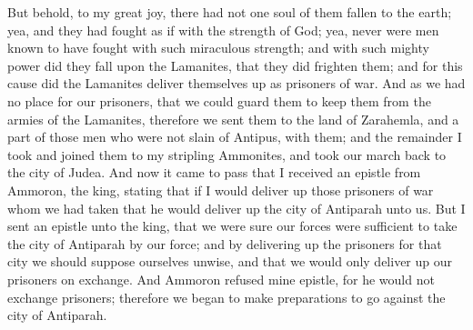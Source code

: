 But behold, to my great joy, there had not one soul of them fallen to the earth; yea, and they had fought as if with the strength of God; yea, never were men known to have fought with such miraculous strength; and with such mighty power did they fall upon the Lamanites, that they did frighten them; and for this cause did the Lamanites deliver themselves up as prisoners of war.
\bverse \iffalse And as we had no place for our prisoners, that we could guard them to keep them from the armies of the Lamanites, therefore we sent them to the land of Zarahemla, and a part of those men who were not slain of Antipus, with them; and the remainder I took and joined them to my stripling Ammonites, and took our march back to the city of Judea. \fi
And as we had no place for our prisoners, that we could guard them to keep them from the armies of the Lamanites, therefore we sent them to the land of Zarahemla, and a part of those men who were not slain of Antipus, with them; and the remainder I took and joined them to my stripling Ammonites, and took our march back to the city of Judea.
\bchapter
\bverse \iffalse And now it came to pass that I received an epistle from Ammoron, the king, stating that if I would deliver up those prisoners of war whom we had taken that he would deliver up the city of Antiparah unto us. \fi
And now it came to pass that I received an epistle from Ammoron, the king, stating that if I would deliver up those prisoners of war whom we had taken that he would deliver up the city of Antiparah unto us.
\bverse \iffalse But I sent an epistle unto the king, that we were sure our forces were sufficient to take the city of Antiparah by our force; and by delivering up the prisoners for that city we should suppose ourselves unwise, and that we would only deliver up our prisoners on exchange. \fi
But I sent an epistle unto the king, that we were sure our forces were sufficient to take the city of Antiparah by our force; and by delivering up the prisoners for that city we should suppose ourselves unwise, and that we would only deliver up our prisoners on exchange.
\bverse \iffalse And Ammoron refused mine epistle, for he would not exchange prisoners; therefore we began to make preparations to go against the city of Antiparah. \fi
And Ammoron refused mine epistle, for he would not exchange prisoners; therefore we began to make preparations to go against the city of Antiparah.
\bverse \iffalse But the people of Antiparah did leave the city, and fled to their other cities, which they had possession of, to fortify them; and thus the city of Antiparah fell into our hands. \fi
